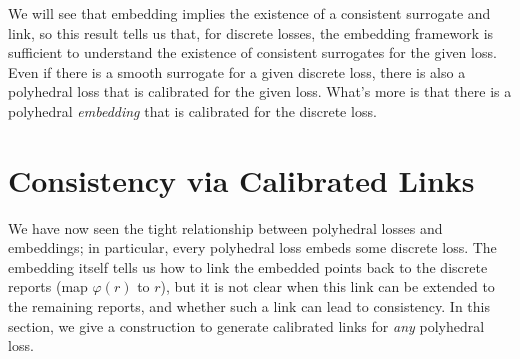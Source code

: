 \documentclass[12pt]{article}
\newcommand{\Comments}{1}
\newcommand{\mynote}[2]{\ifnum\Comments=1\textcolor{#1}{#2}\fi}
\newcommand{\mytodo}[2]{\ifnum\Comments=1%
  \todo[linecolor=#1!80!black,backgroundcolor=#1,bordercolor=#1!80!black]{#2}\fi}
\newcommand{\raf}[1]{\mynote{darkgreen}{[RF: #1]}}
\newcommand{\jessiet}[1]{\mytodo{teal!20!white}{JF: #1}}
\newcommand{\btw}[1]{\mytodo{gray!20!white}{BTW: #1}}%
\newtheorem{corollary}{Corollary}
\begin{document}
We will see that embedding implies the existence of a consistent surrogate and link, so this result tells us that, for discrete losses, the embedding framework is sufficient to understand the existence of consistent surrogates for the given loss.
Even if there is a smooth surrogate for a given discrete loss, there is also a polyhedral loss that is calibrated for the given loss.
What's more is that there is a polyhedral \emph{embedding} that is calibrated for the discrete loss.




\section{Consistency via Calibrated Links}
\label{sec:calibration}

We have now seen the tight relationship between polyhedral losses and embeddings; in particular, every polyhedral loss embeds some discrete loss.
The embedding itself tells us how to link the embedded points back to the discrete reports (map $\varphi(r)$ to $r$), but it is not clear when this link can be extended to the remaining reports, and whether such a link can lead to consistency.
In this section, we give a construction to generate calibrated links for \emph{any} polyhedral loss.
\end{document}
